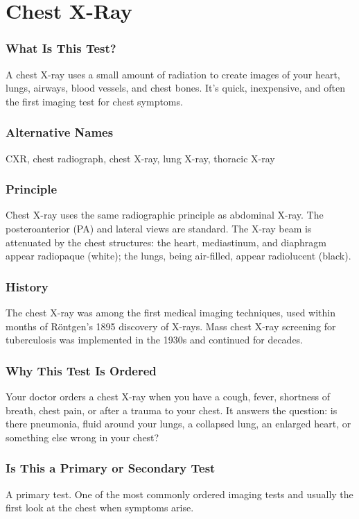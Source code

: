 \section{Chest X-Ray}


\subsubsection*{What Is This Test?}
A chest X-ray uses a small amount of radiation to create images of your heart, lungs, airways, blood vessels, and chest bones. It's quick, inexpensive, and often the first imaging test for chest symptoms.

\subsubsection*{Alternative Names}
CXR, chest radiograph, chest X-ray, lung X-ray, thoracic X-ray


\subsubsection*{Principle}
Chest X-ray uses the same radiographic principle as abdominal X-ray. The posteroanterior (PA) and lateral views are standard. The X-ray beam is attenuated by the chest structures: the heart, mediastinum, and diaphragm appear radiopaque (white); the lungs, being air-filled, appear radiolucent (black).

\subsubsection*{History}
The chest X-ray was among the first medical imaging techniques, used within months of Röntgen's 1895 discovery of X-rays. Mass chest X-ray screening for tuberculosis was implemented in the 1930s and continued for decades.

\subsubsection*{Why This Test Is Ordered}
Your doctor orders a chest X-ray when you have a cough, fever, shortness of breath, chest pain, or after a trauma to your chest. It answers the question: is there pneumonia, fluid around your lungs, a collapsed lung, an enlarged heart, or something else wrong in your chest?

\subsubsection*{Is This a Primary or Secondary Test}
A primary test. One of the most commonly ordered imaging tests and usually the first look at the chest when symptoms arise.

